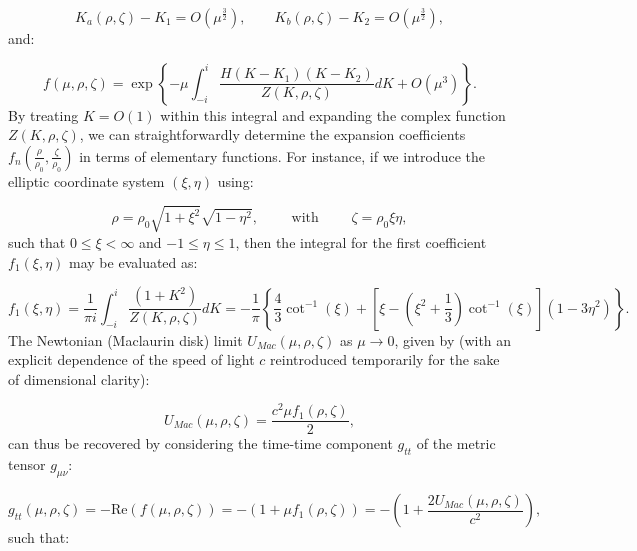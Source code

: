 \documentclass{article}
\begin{document}
\begin{equation}
K_a \left( \rho, \zeta \right) - K_1 = O \left( \mu^{\frac{3}{2}} \right), \qquad K_b \left( \rho, \zeta \right) - K_2 = O \left( \mu^{\frac{3}{2}} \right),
\end{equation}
and:

\begin{equation}
f \left( \mu, \rho, \zeta \right) = \exp \left\lbrace - \mu \int_{-i}^{i} \frac{H \left( K - K_1 \right) \left( K - K_2 \right)}{Z \left( K, \rho, \zeta \right)} dK + O \left( \mu^3 \right) \right\rbrace.
\end{equation}
By treating ${K = O \left( 1 \right)}$ within this integral and expanding the complex function ${Z \left( K, \rho, \zeta \right)}$, we can straightforwardly determine the expansion coefficients ${f_n \left( \frac{\rho}{\rho_0}, \frac{\zeta}{\rho_0} \right)}$ in terms of elementary functions. For instance, if we introduce the elliptic coordinate system ${\left( \xi, \eta \right)}$ using:

\begin{equation}
\rho = \rho_0 \sqrt{1 + \xi^2} \sqrt{1 - \eta^2}, \qquad \text{ with } \qquad \zeta = \rho_0 \xi \eta,
\end{equation}
such that ${0 \leq \xi < \infty}$ and ${-1 \leq \eta \leq 1}$, then the integral for the first coefficient ${f_1 \left( \xi, \eta \right)}$ may be evaluated as:

\begin{equation}
f_1 \left( \xi, \eta \right) = \frac{1}{\pi i} \int_{-i}^{i} \frac{\left( 1 + K^2 \right)}{Z \left( K, \rho, \zeta \right)} dK = - \frac{1}{\pi} \left\lbrace \frac{4}{3} \cot^{-1} \left( \xi \right) + \left[ \xi - \left( \xi^2 + \frac{1}{3} \right) \cot^{-1} \left( \xi \right) \right] \left( 1 - 3 \eta^2 \right) \right\rbrace.
\end{equation}
The Newtonian (Maclaurin disk) limit ${U_{Mac} \left( \mu, \rho, \zeta \right)}$ as ${\mu \to 0}$, given by (with an explicit dependence of the speed of light $c$ reintroduced temporarily for the sake of dimensional clarity):

\begin{equation}
U_{Mac} \left( \mu, \rho, \zeta \right) = \frac{c^2 \mu f_1 \left( \rho, \zeta \right)}{2},
\end{equation}
can thus be recovered by considering the time-time component ${g_{t t}}$ of the metric tensor ${g_{\mu \nu}}$:

\begin{equation}
g_{t t} \left( \mu, \rho, \zeta \right) = - \mathrm{Re} \left( f \left( \mu, \rho, \zeta \right) \right) = - \left( 1 + \mu f_1 \left( \rho, \zeta \right) \right) = - \left( 1 + \frac{2 U_{Mac} \left( \mu, \rho, \zeta \right)}{c^2} \right),
\end{equation}
such that:
\end{document}
